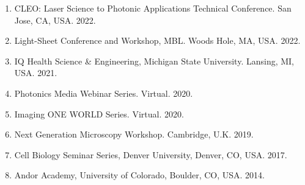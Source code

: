 \begin{enumerate}
\item CLEO: Laser Science to Photonic Applications Technical Conference. San Jose, CA, USA. 2022.
\item Light-Sheet Conference and Workshop, MBL.  Woods Hole, MA, USA. 2022.
\item IQ Health Science \& Engineering, Michigan State University. Lansing, MI, USA. 2021.
\item Photonics Media Webinar Series.  Virtual. 2020.
\item Imaging ONE WORLD Series. Virtual. 2020.
\item Next Generation Microscopy Workshop.  Cambridge, U.K. 2019.
\item Cell Biology Seminar Series, Denver University, Denver, CO, USA. 2017.
\item Andor Academy, University of Colorado, Boulder, CO, USA. 2014.
\end{enumerate}